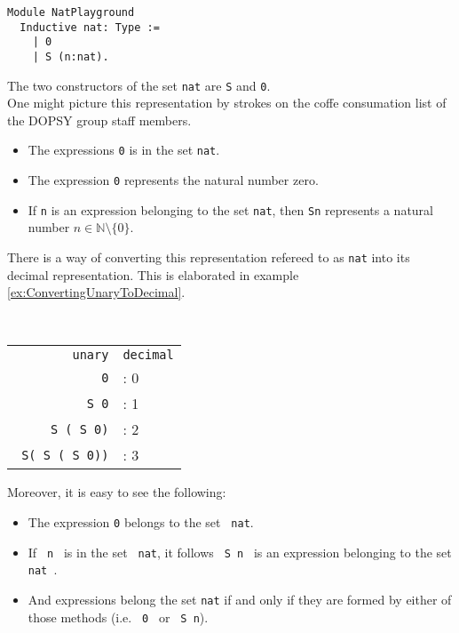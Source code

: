   \begin{lstlisting}[caption={\lstinline!nat!}, label=lst:DefNat]
  Module NatPlayground
  Inductive nat: Type :=
    | 0
    | S (n:nat).
  \end{lstlisting}  
  The two constructors of the set \lstinline!nat! are \lstinline!S! and \lstinline!0!. \\

 One might picture this representation by strokes on the coffe consumation list of the DOPSY group staff members.  
  \begin{itemize}
  \item The expressions \lstinline!0! is in the set \lstinline!nat!.
  \item The expression \lstinline!0! represents the natural number zero. 
  \item If \lstinline!n! is an expression belonging to the set \lstinline!nat!, then \lstinline!Sn! represents a natural number $n\in\mathbb{N}\setminus\{ 0\}$.  
  \end{itemize}
  There is a way of converting this representation refereed to as \lstinline!nat! into its decimal representation. 
  This is elaborated in example \ref{ex:ConvertingUnaryToDecimal}.
  \begin{example} \label{ex:ConvertingUnaryToDecimal} ~\\%
  \begin{center}  
	  \begin{tabular} {r l}
	  
		  \texttt{unary}				& \texttt{decimal}	\\
		  \texttt{\lstinline!0!} 		&: 0 				\\
		  \texttt{\lstinline! S 0!}  	&: 1				\\
		  \texttt{\lstinline! S ( S 0)!}	&: 2			\\
		  \texttt{\lstinline! S( S ( S 0))!}	&: 3		\\
		    
	  \end{tabular}
	  \end{center}
  \end{example}
  Moreover, it is easy to see the following: 
  \begin{itemize}
  \item The expression \lstinline!0! belongs to the set \lstinline! nat!.
  \item If \lstinline! n ! is in the set \lstinline! nat!, it follows \lstinline! S n ! is an expression belonging to the set \lstinline! nat !.
  \item And expressions belong the set \lstinline!nat! if and only if they are  formed by either of those methods (i.e. \lstinline! 0 ! or  \lstinline! S n!). 
  \end{itemize}  
